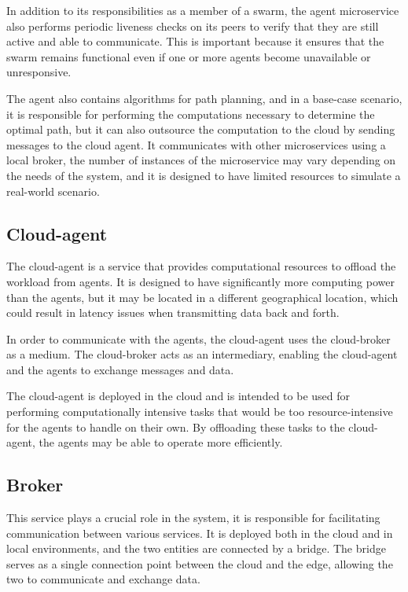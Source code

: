 In addition to its responsibilities as a member of a swarm, the agent microservice also performs periodic liveness checks on its peers to verify that they are still active and able to communicate. This is important because it ensures that the swarm remains functional even if one or more agents become unavailable or unresponsive.

The agent  also contains algorithms for path planning, and in a base-case scenario, it is responsible for performing the computations necessary to determine the optimal path, but it can also outsource the computation to the cloud by sending messages to the cloud agent. It communicates with other microservices using a local broker, the number of instances of the  microservice may vary depending on the needs of the system, and it is designed to have limited resources to simulate a real-world scenario. 

\subsection{Cloud-agent}
The cloud-agent is a service that provides computational resources to offload the workload from agents. It is designed to have significantly more computing power than the agents, but it may be located in a different geographical location, which could result in latency issues when transmitting data back and forth.

In order to communicate with the agents, the cloud-agent uses the cloud-broker as a medium. The cloud-broker acts as an intermediary, enabling the cloud-agent and the agents to exchange messages and data.

The cloud-agent is deployed in the cloud and is intended to be used for performing computationally intensive tasks that would be too resource-intensive for the agents to handle on their own. By offloading these tasks to the cloud-agent, the agents may be able to operate more efficiently.

\subsection{Broker}
This service plays a crucial role in the system, it is responsible for facilitating communication between various services. It is deployed both in the cloud and in local environments, and the two entities are connected by a bridge. The bridge serves as a single connection point between the cloud and the edge, allowing the two to communicate and exchange data.

